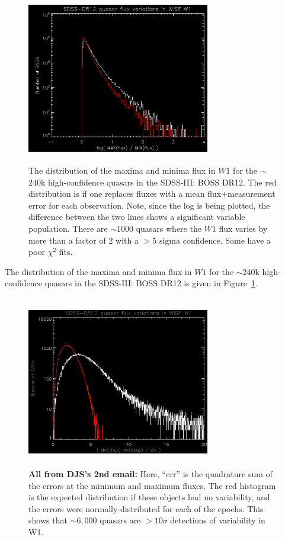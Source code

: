 \documentclass{emulateapj}
\begin{document}
\begin{figure}
  \includegraphics[width=8.00cm, height=7.50cm, trim=0.0cm 0.0cm 0.0cm 0.0cm, clip]
  {fig1.png}
  \centering
  \caption[]{
    The distribution of the maxima and
    minima flux in $W1$ for the $\sim$240k high-confidence quasars in the
    SDSS-III: BOSS DR12.  The red distribution is if one replaces fluxes
    with a mean flux$+$measurement error for each observation.  Note,
    since the log is being plotted, the difference between the two lines
    shows a significant variable population.  There are $\sim$1000 quasars
    where the $W1$ flux varies by more than a factor of 2 with a $>5$
    sigma confidence.  Some have a poor $\chi{^2}$ fits.
  }
  \label{fig:maxminflux}
\end{figure}
The distribution of the maxima and minima flux in $W1$ for the
$\sim$240k high-confidence quasars in the SDSS-III: BOSS DR12 is given
in Figure~\ref{fig:maxminflux}.

\begin{figure}
  \includegraphics[width=8.00cm, height=7.50cm, trim=0.0cm 0.0cm 0.0cm 0.0cm, clip]
  {fig2.png}
  \centering
  \caption[]{
    {\bf All from DJS's 2nd email:} 
    Here, ``err'' is the quadrature sum of the errors at the minimum and maximum fluxes.
    The red histogram is the expected distribution if these objects had no variability, 
    and the errors were normally-distributed for each of the epochs.
    This shows that $\sim6,000$ quasars are $>10\sigma$ detections of variability in W1.
  }
  \label{fig:maxmin_err}
\end{figure}
\end{document}
